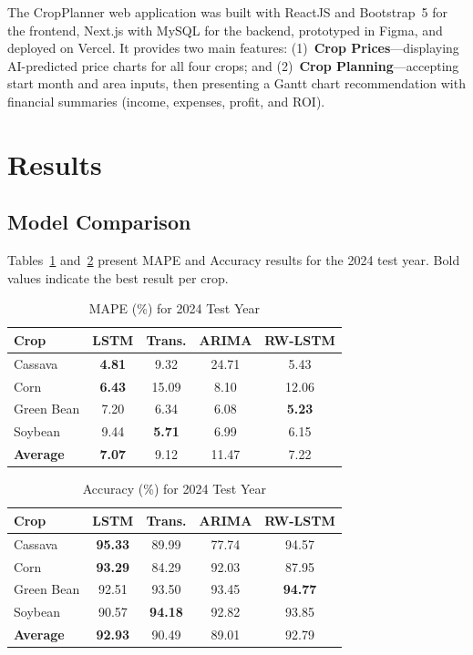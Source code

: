 \documentclass[conference]{IEEEtran}
\begin{document}
The CropPlanner web application was built with ReactJS and Bootstrap~5 for the frontend, Next.js with MySQL for the backend, prototyped in Figma, and deployed on Vercel. It provides two main features: (1)~\textbf{Crop Prices}---displaying AI-predicted price charts for all four crops; and (2)~\textbf{Crop Planning}---accepting start month and area inputs, then presenting a Gantt chart recommendation with financial summaries (income, expenses, profit, and ROI).

\section{Results}

\subsection{Model Comparison}

Tables~\ref{tab:mape} and~\ref{tab:accuracy} present MAPE and Accuracy results for the 2024 test year. Bold values indicate the best result per crop.

\begin{table}[htbp]
  \centering
  \caption{MAPE (\%) for 2024 Test Year}
  \label{tab:mape}
  \begin{tabular}{lcccc}
    \toprule
    \textbf{Crop} & \textbf{LSTM} & \textbf{Trans.} & \textbf{ARIMA} & \textbf{RW-LSTM} \\
    \midrule
    Cassava    & \textbf{4.81}  & 9.32  & 24.71 & 5.43  \\
    Corn       & \textbf{6.43}  & 15.09 & 8.10  & 12.06 \\
    Green Bean & 7.20           & 6.34  & 6.08  & \textbf{5.23} \\
    Soybean    & 9.44           & \textbf{5.71} & 6.99 & 6.15 \\
    \midrule
    \textbf{Average} & \textbf{7.07} & 9.12 & 11.47 & 7.22 \\
    \bottomrule
  \end{tabular}
\end{table}

\begin{table}[htbp]
  \centering
  \caption{Accuracy (\%) for 2024 Test Year}
  \label{tab:accuracy}
  \begin{tabular}{lcccc}
    \toprule
    \textbf{Crop} & \textbf{LSTM} & \textbf{Trans.} & \textbf{ARIMA} & \textbf{RW-LSTM} \\
    \midrule
    Cassava    & \textbf{95.33} & 89.99 & 77.74 & 94.57 \\
    Corn       & \textbf{93.29} & 84.29 & 92.03 & 87.95 \\
    Green Bean & 92.51          & 93.50 & 93.45 & \textbf{94.77} \\
    Soybean    & 90.57          & \textbf{94.18} & 92.82 & 93.85 \\
    \midrule
    \textbf{Average} & \textbf{92.93} & 90.49 & 89.01 & 92.79 \\
    \bottomrule
  \end{tabular}
\end{table}
\end{document}
